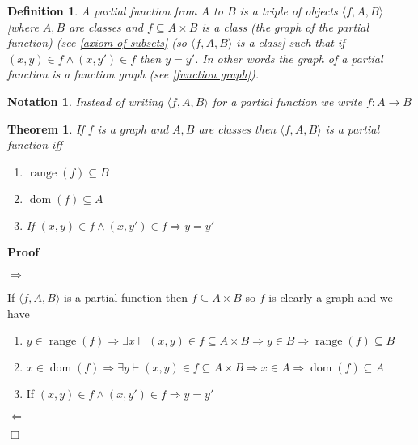 \documentclass{book}
\newcommand{\tmop}[1]{\ensuremath{\operatorname{#1}}}
\newenvironment{proof}{\noindent\textbf{Proof\ }}{\hspace*{\fill}$\Box$\medskip}
\newtheorem{definition}{Definition}
{\theorembodyfont{\rmfamily}\newtheorem{example}{Example}}
\newtheorem{notation}{Notation}
{\theorembodyfont{\rmfamily}\newtheorem{note}{Note}}
\newtheorem{theorem}{Theorem}
\begin{document}
{{\begin{definition}
  {}{}A partial function from
  $A$ to $B$ is a triple of objects $\langle f, A, B \rangle$ [where $A, B$
  are classes and $f \subseteq A \times B$ is a class (the graph of the
  partial function) (see \ref{axiom of subsets} (so $\langle f, A, B \rangle$
  is a class] such that if $(x, y) \in f \wedge (x, y') \in f$ then $y = y'$.
  In other words the graph of a partial function is a function graph (see
  \ref{function graph}).
\end{definition}

\begin{notation}
  Instead of writing $\langle f, A, B \rangle$ for a partial function we write
  $f : A \rightarrow B$
\end{notation}

\begin{theorem}
  \label{alternative definition of partial function}If $f$ is a graph and $A,
  B$ are classes then $\langle f, A, B \rangle$ is a partial function iff
  \begin{enumerate}
    \item $\tmop{range} (f) \subseteq B$
    
    \item $\tmop{dom} (f) \subseteq A$
    
    \item If $(x, y) \in f \wedge (x, y') \in f \Rightarrow y = y'$
  \end{enumerate}
\end{theorem}

\begin{proof}
  
  
  $\Rightarrow$
  
  If $\langle f, A, B \rangle$ is a partial function then $f \subseteq A
  \times B$ so $f$ is clearly a graph and we have
  \begin{enumerate}
    \item $y \in \tmop{range} (f) \Rightarrow \exists x \vdash (x, y) \in f
    \subseteq A \times B \Rightarrow y \in B \Rightarrow \tmop{range} (f)
    \subseteq B$
    
    \item $x \in \tmop{dom} (f) \Rightarrow \exists y \vdash (x, y) \in f
    \subseteq A \times B \Rightarrow x \in A \Rightarrow \tmop{dom} (f)
    \subseteq A$
    
    \item If $(x, y) \in f \wedge (x, y') \in f \Rightarrow y = y'$
  \end{enumerate}
  $\Leftarrow$
  

\end{proof}}}
\end{document}
